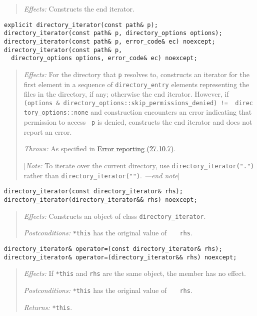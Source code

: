 \begin{quote}
\emph{Effects:} Constructs the end iterator.
\end{quote}

\begin{verbatim}
explicit directory_iterator(const path& p);
directory_iterator(const path& p, directory_options options);
directory_iterator(const path& p, error_code& ec) noexcept;
directory_iterator(const path& p,
  directory_options options, error_code& ec) noexcept;
\end{verbatim}

\begin{quote}
\emph{Effects:} For the directory that \texttt{p} resolves to,
constructs an iterator for the first element in a sequence of
\texttt{directory\_entry} elements representing the files in the
directory, if any; otherwise the end iterator. However, if
\texttt{(options\ \&\ directory\_options::skip\_permissions\_denied)\ !=\ \ directory\_options::none}
and construction encounters an error indicating that permission to
access~ \texttt{p} is denied, constructs the end iterator and does not
report an error.

\emph{Throws:} As specified in \hyperref[Error-reporting]{Error
reporting (27.10.7)}.

{[}\emph{Note:} To iterate over the current directory, use
\texttt{directory\_iterator(".")} rather than
\texttt{directory\_iterator("")}. \emph{---end note}{]}
\end{quote}

\begin{verbatim}
directory_iterator(const directory_iterator& rhs);
directory_iterator(directory_iterator&& rhs) noexcept;
\end{verbatim}

\begin{quote}
\emph{Effects:} Constructs an object of class
\texttt{directory\_iterator}.

\emph{Postconditions:} \texttt{*this} has the original value of
\texttt{\ \ \ rhs}.
\end{quote}

\begin{verbatim}
directory_iterator& operator=(const directory_iterator& rhs);
directory_iterator& operator=(directory_iterator&& rhs) noexcept;
\end{verbatim}

\begin{quote}
\emph{Effects:} If \texttt{*this} and \texttt{rhs} are the same object,
the member has no effect.

\emph{Postconditions:} \texttt{*this} has the original value of
\texttt{\ \ \ rhs}.

\emph{Returns:} \texttt{*this}.
\end{quote}

